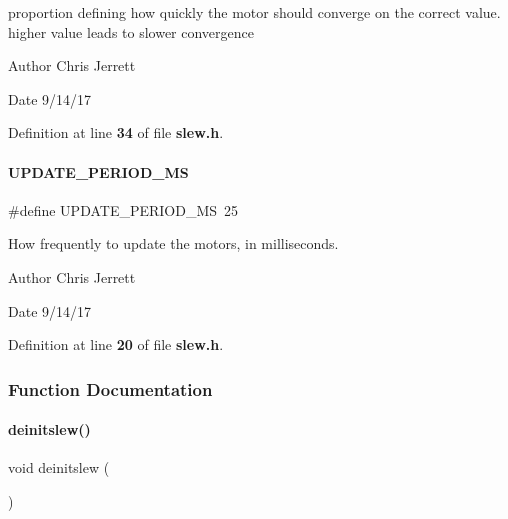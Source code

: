 proportion defining how quickly the motor should converge on the correct value. higher value leads to slower convergence 

\begin{DoxyAuthor}{Author}
Chris Jerrett 
\end{DoxyAuthor}
\begin{DoxyDate}{Date}
9/14/17 
\end{DoxyDate}


Definition at line \textbf{ 34} of file \textbf{ slew.\+h}.

\mbox{\label{slew_8h_a4e8e7d6fdd1f5c6f8a0f341e4b61f025}} 
\paragraph{U\+P\+D\+A\+T\+E\+\_\+\+P\+E\+R\+I\+O\+D\+\_\+\+MS}
{\footnotesize\ttfamily \#define U\+P\+D\+A\+T\+E\+\_\+\+P\+E\+R\+I\+O\+D\+\_\+\+MS~25}



How frequently to update the motors, in milliseconds. 

\begin{DoxyAuthor}{Author}
Chris Jerrett 
\end{DoxyAuthor}
\begin{DoxyDate}{Date}
9/14/17 
\end{DoxyDate}


Definition at line \textbf{ 20} of file \textbf{ slew.\+h}.



\subsubsection{Function Documentation}
\mbox{\label{slew_8h_a981c9990a969d2587e66e550737f7cd9}} 
\paragraph{deinitslew()}
{\footnotesize\ttfamily void deinitslew (\begin{DoxyParamCaption}{ }\end{DoxyParamCaption})}



